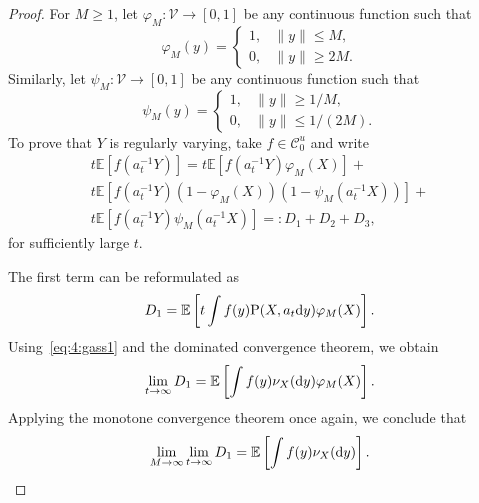\documentclass[preprint,12pt]{elsarticle}
\theoremstyle{definition}
\theoremstyle{remark}
\newcommand{\Xbf}{{ X}}
\newcommand{\Ybf}{{ Y}}
\newcommand{\bfy}{{ y}}
\newcommand{\1}{{\mathbf 1}}
\numberwithin{equation}{section}
\newcommand{\Ebb}{\mathbb{E}}  %
\newcommand{\ud}{{\rm d}}
\newcommand{\Prm}{{\rm P}}
\newcommand{\Vcal}{\mathcal{V}}
\newcommand{\Ccal}{\mathcal{C}}
\begin{document}
  \begin{proof}
    For \( M \geq 1 \), let \(\varphi_M \colon \Vcal \to [0,1]\) 
    be any continuous function such that  
    \begin{equation*}  
      \varphi_M(\bfy) =  
      \begin{cases}  
        1, & \|\bfy\| \leq M, \\  
        0, & \|\bfy\| \geq 2M.  
      \end{cases}  
    \end{equation*}  
    Similarly, let \(\psi_M \colon \Vcal \to [0,1]\) 
    be any continuous function such that  
    \begin{equation*}  
      \psi_M(\bfy) =  
      \begin{cases}  
        1, & \|\bfy\| \geq 1/M, \\  
        0, & \|\bfy\| \leq 1/(2M).  
      \end{cases}  
    \end{equation*}  
    To prove that \(\Ybf\) is regularly varying, 
    take \( f \in \Ccal_0^u \) and write  
    \begin{multline*}  
      t \Ebb \left[f\left(a_t^{-1} \Ybf\right)\right] =  
      t \Ebb\left[f\left(a_t^{-1} \Ybf\right) \varphi_M\left(\Xbf\right)\right] + \\  
      t \Ebb\left[f\left(a_t^{-1} \Ybf\right) \left(1 - \varphi_M\left(\Xbf\right)\right)  
      \left(1 - \psi_M\left(a_t^{-1} \Xbf\right)\right)\right] + \\  
      t \Ebb\left[f\left(a_t^{-1} \Ybf\right) \psi_M\left(a_t^{-1} \Xbf\right)\right] 
      =: D_1 + D_2 + D_3,  
    \end{multline*}  
    for sufficiently large $t$.  

    The first term can be reformulated as  
    \begin{equation*}  
      D_1 = \Ebb \left[t \int f(\bfy) \Prm(\Xbf, a_t \ud \bfy) \varphi_M(\Xbf)\right].  
    \end{equation*}  
    Using~\eqref{eq:4:gass1} 
    and the dominated convergence theorem, we obtain  
    \begin{equation*}  
      \lim_{t \to \infty} D_1 
      = \Ebb \left[\int f(\bfy) \nu_{\Xbf}(\ud \bfy) \varphi_M(\Xbf)\right].  
    \end{equation*}  
    Applying the monotone convergence theorem once again, we conclude that  
    \begin{equation*}  
      \lim_{M \to \infty} \lim_{t \to \infty} D_1 
      = \Ebb \left[\int f(\bfy) \nu_{\Xbf}(\ud \bfy)\right].  
    \end{equation*}  


\end{proof}
\end{document}

